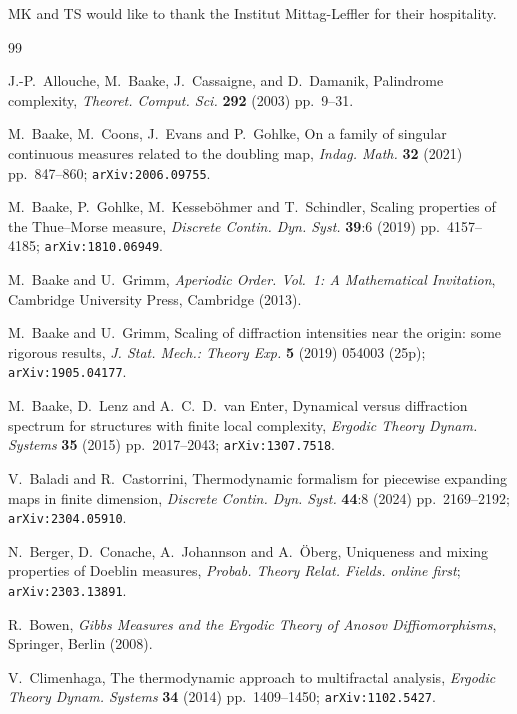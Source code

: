 \documentclass[11pt,reqno]{amsart}
\theoremstyle{plain}
\theoremstyle{definition}
\newcommand{\ts}{\hspace{0.5pt}}
\begin{document}
MK and TS would like to thank the Institut Mittag-Leffler for their hospitality.




\begin{thebibliography}{99}

J.-P.~Allouche, M.~Baake, J.~Cassaigne, and D.~Damanik, 
Palindrome complexity,
\textit{Theoret. Comput. Sci.} \textbf{292} (2003) pp.~9--31.




M.~Baake, M.~Coons, J.~Evans and P.~Gohlke,
On a family of singular continuous measures related to the doubling map,
\textit{Indag. Math.} \textbf{32} (2021) pp.~847--860;
\texttt{arXiv:2006.09755}.

M.~Baake, P.~Gohlke, M.~Kesseb\"ohmer and T.~Schindler,
Scaling properties of the Thue\ts--Morse measure,
\textit{Discrete Contin. Dyn. Syst.}
\textbf{39}:6 (2019) pp.~4157--4185;
\texttt{arXiv:1810.06949}.


M.~Baake and U.~Grimm,
\textit{Aperiodic Order. Vol.~1: A Mathematical Invitation}, Cambridge University Press, Cambridge (2013).

M.~Baake and U.~Grimm,
Scaling of diffraction intensities near the origin: some rigorous results, 
\textit{J. Stat. Mech.: Theory Exp.}
\textbf{5} (2019) 054003 (25p);
\texttt{arXiv:1905.04177}.

M.~Baake, D.~Lenz and A.~C.~D.~van Enter, 
Dynamical versus diffraction spectrum for structures with finite local complexity, 
\textit{Ergodic Theory Dynam. Systems} \textbf{35} (2015) pp.~2017--2043; 
\texttt{arXiv:1307.7518}.

V.~Baladi and R.~Castorrini,
Thermodynamic formalism for piecewise expanding maps in finite dimension,
\textit{Discrete Contin. Dyn. Syst.}
\textbf{44}:8 (2024) pp.~2169--2192;
 \texttt{arXiv:2304.05910}. 

N.~Berger, D.~Conache, A.~Johannson and A.~\"{O}berg,  
Uniqueness and mixing properties of Doeblin measures,
\textit{Probab. Theory Relat. Fields.}
\textit{online first};
\texttt{arXiv:2303.13891}.

R.~Bowen,
\textit{Gibbs Measures and the Ergodic Theory of Anosov
Diffiomorphisms}, Springer, Berlin (2008).

V.~Climenhaga, 
The thermodynamic approach to multifractal analysis,
\textit{Ergodic Theory Dynam. Systems} \textbf{34} (2014) pp.~1409--1450;
\texttt{arXiv:1102.5427}.


\end{thebibliography}
\end{document}
